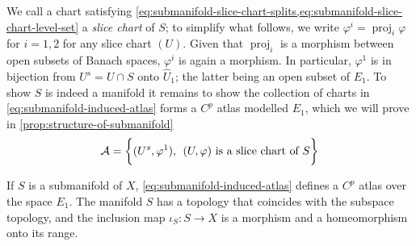 \documentclass[../main-manifolds.tex]{subfiles}
\begin{document}
We call a chart satisfying \cref{eq:submanifold-slice-chart-splits,eq:submanifold-slice-chart-level-set} a \emph{slice chart} of $S$; to simplify what follows, we write $\varphi^i = \operatorname{proj}_i\varphi$ for $i = 1,2$ for any slice chart $(U)$. Given that $\operatorname{proj}_i$ is a morphism between open subsets of Banach spaces, $\varphi^i$ is again a morphism. In particular, $\varphi^1$ is in bijection from $U^s=U\cap S$ onto $\hat{U}_1$; the latter being an open subset of $E_1$. To show $S$ is indeed a manifold it remains to show the collection of charts in \cref{eq:submanifold-induced-atlas} forms a $C^p$ atlas modelled $E_1$, which we will prove in \cref{prop:structure-of-submanifold}
\begin{equation}\label{eq:submanifold-induced-atlas}
    \mathcal{A} = \biggl\{{(U^s, \varphi^1),\:\: (U,\varphi)\text{ is a slice chart of }S}\biggr\}
\end{equation}
\begin{wts}\label{prop:structure-of-submanifold}
    If $S$ is a submanifold of $X$, \cref{eq:submanifold-induced-atlas} defines a $C^p$ atlas over the space $E_1$. The manifold $S$ has a topology that coincides with the subspace topology, and the inclusion map $\iota_S: S\to X$ is a morphism and a homeomorphism onto its range.
\end{wts}
\end{document}
